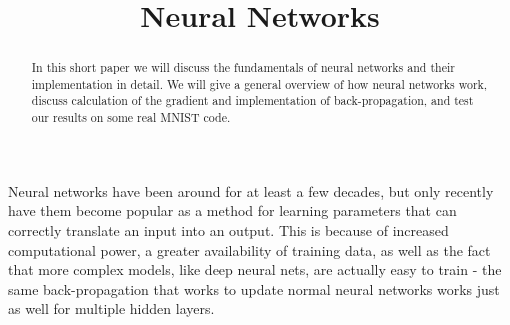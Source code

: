 \documentclass[10pt,letterpaper]{article}
\title{\vspace{-4ex}Neural Networks\vspace{-3.5ex}}
\begin{document}
\maketitle
\vspace{-0.5em}
\begin{abstract}
In this short paper we will discuss the fundamentals of neural networks and their implementation in detail. We will give a general overview of how neural networks work, discuss calculation of the gradient and implementation of back-propagation, and test our results on some real MNIST code.
\end{abstract}
Neural networks have been around for at least a few decades, but only recently have them become popular as a method for learning parameters that can correctly translate an input into an output. This is because of increased computational power, a greater availability of training data, as well as the fact that more complex models, like deep neural nets, are actually easy to train - the same back-propagation that works to update normal neural networks works just as well for multiple hidden layers.
\end{document}
